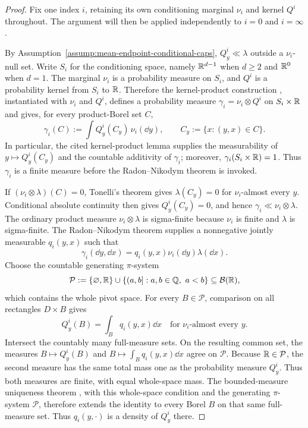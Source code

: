 \begin{proof}
Fix one index $i$, retaining its own conditioning marginal $\nu_i$ and
kernel $Q^i$ throughout.  The argument will then be applied independently to
$i=0$ and $i=\infty$.

By Assumption~\ref{assump:mean-endpoint-conditional-caps}, $Q^i_y\ll\lambda$
outside a $\nu_i$-null set.  Write $S_i$ for the conditioning space, namely
$\mathbb{R}^{d-1}$ when $d\geq2$ and $\mathbb{R}^0$ when $d=1$.  The marginal $\nu_i$ is a
probability measure on $S_i$, and $Q^i$ is a probability kernel from $S_i$
to $\mathbb{R}$.  Therefore the kernel-product construction
\cite[Lemma~1.41(iii)]{Kallenberg2002}, instantiated with $\nu_i$ and $Q^i$,
defines a probability measure $\gamma_i=\nu_i\otimes Q^i$ on
$S_i\times\mathbb{R}$ and gives, for every product-Borel set $C$,
\[
\gamma_i(C):=\int Q^i_y(C_y)\,\nu_i(\dd y),
\qquad C_y:=\{x:(y,x)\in C\}.
\]
In particular, the cited kernel-product lemma supplies the measurability of
$y\mapsto Q^i_y(C_y)$ and the countable additivity of $\gamma_i$; moreover,
$\gamma_i(S_i\times\mathbb{R})=1$.  Thus $\gamma_i$ is a finite measure before the
Radon--Nikodym theorem is invoked.

If $(\nu_i\otimes\lambda)(C)=0$, Tonelli's theorem
\cite[Theorem~2.37]{Folland1999} gives
$\lambda(C_y)=0$ for $\nu_i$-almost every $y$.  Conditional absolute
continuity then gives $Q^i_y(C_y)=0$, and hence
$\gamma_i\ll\nu_i\otimes\lambda$.  The ordinary product measure
$\nu_i\otimes\lambda$ is sigma-finite because $\nu_i$ is finite and
$\lambda$ is sigma-finite.  The Radon--Nikodym theorem
\cite[Theorem~3.8]{Folland1999} supplies a
nonnegative jointly measurable $q_i(y,x)$ such that
\[
\gamma_i(\dd y,\dd x)=q_i(y,x)\nu_i(\dd y)\lambda(\dd x).
\]
Choose the countable generating $\pi$-system
\[
\mathcal P:=\{\varnothing,\mathbb{R}\}
 \cup\{(a,b]:a,b\in\mathbb Q,\ a<b\}
\subseteq\mathcal B(\mathbb{R}),
\]
which contains the whole pivot space.  For every $B\in\mathcal P$,
comparison on all rectangles $D\times B$ gives
\[
Q^i_y(B)=\int_Bq_i(y,x)\dd x
\quad\text{for $\nu_i$-almost every $y$}.
\]
Intersect the countably many full-measure sets.  On the resulting common set,
the measures $B\mapsto Q^i_y(B)$ and
$B\mapsto\int_Bq_i(y,x)\dd x$ agree on $\mathcal P$.  Because
$\mathbb{R}\in\mathcal P$, the second measure has the same total mass one as the
probability measure $Q^i_y$.  Thus both measures are finite, with equal
whole-space mass.  The
bounded-measure uniqueness theorem \cite[Lemma~1.17]{Kallenberg2002}, with
this whole-space condition and the generating $\pi$-system $\mathcal P$,
therefore extends the identity to every Borel $B$ on that same full-measure
set.  Thus $q_i(y,\cdot)$ is a density of $Q^i_y$ there.


\end{proof}
